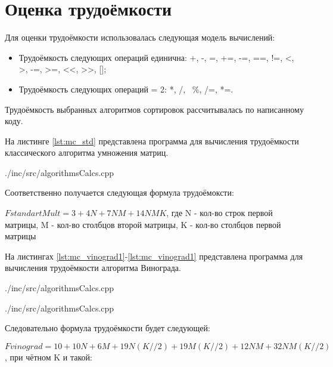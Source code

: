 \newpage
\section{Оценка трудоёмкости}
Для оценки трудоёмкости использовалась следующая модель вычислений: \cite{calc_model}
\begin{itemize}
	\item Трудоёмкость следующих операций единична: +, -, =, +=, -=, ==, !=, <, >, -=, >=, <<, >>, [];
	\item Трудоёмкость следующих операций = 2: *, /, \, \%, /=, *=.
\end{itemize}

Трудоёмкость выбранных алгоритмов сортировок рассчитывалась по написанному коду.

На листинге \ref{lst:mc_std} представлена программа для вычисления трудоёмкости классического алгоритма умножения матриц.

\newpage
\begin{lstinputlisting}[
	caption={Вычисление трудоёмкости классического алгоритма умножения матриц},
	label={lst:mc_std},
	style={c},
	linerange={1-27},
	]{./inc/src/algorithmsCalcs.cpp}
\end{lstinputlisting}

Соответственно получается следующая формула трудоёмоксти:

$FstandartMult = 3+4N+7NM+14NMK$, где N - кол-во строк первой матрицы, M - кол-во столбцов второй матрицы, K - кол-во столбцов первой матрицы

На листингах \ref{lst:mc_vinograd1}-\ref{lst:mc_vinograd1} представлена программа для вычисления трудоёмкости алгоритма Винограда.

\newpage
\begin{lstinputlisting}[
	caption={Вычисление трудоёмкости алгоритма Винограда, часть 1},
	label={lst:mc_vinograd1},
	style={c},
	linerange={29-61},
	]{./inc/src/algorithmsCalcs.cpp}
\end{lstinputlisting}

\newpage
\begin{lstinputlisting}[
	caption={Вычисление трудоёмкости алгоритма Винограда, часть 2},
	label={lst:mc_vinograd1},
	style={c},
	linerange={63-100},
	]{./inc/src/algorithmsCalcs.cpp}
\end{lstinputlisting}

Следовательно формула трудоёмкости будет следующей:

$Fvinograd = 10+10N+6M+19N(K//2)+19M(K//2)+12NM+32NM(K//2)$,  при чётном K
и такой:

